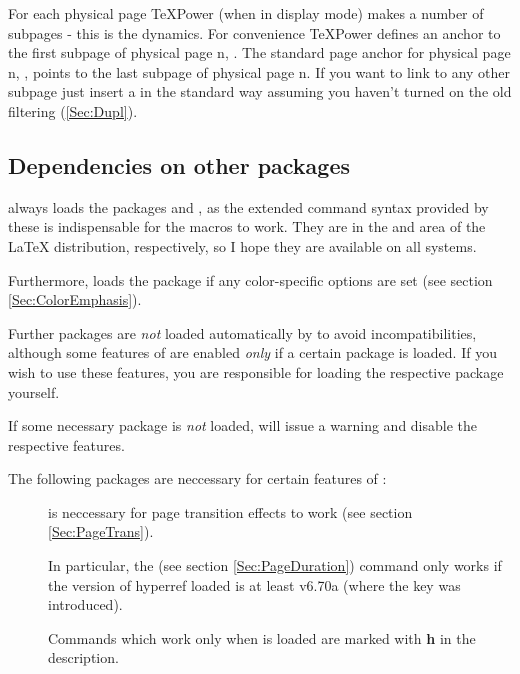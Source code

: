 \begin{slide}
For each physical page \TeX Power (when in display mode) makes a number of subpages - this is
the dynamics. For convenience \TeX Power defines an anchor to the first subpage of physical page n,
. The standard page anchor for physical page n,
, points to the last subpage of physical page n. If you want to
link to any other subpage just insert a  in the standard way assuming you haven't
turned on the old filtering (\ref{Sec:Dupl}).

\newslide

\subsection{Dependencies on other packages}
 always loads the packages  and , as the extended command syntax provided by
these is indispensable for the macros to work. They are in the  and  area of the \LaTeX{}
distribution, respectively, so I hope they are available on all systems.

Furthermore,  loads the package  if any color-specific options are set (see section
\ref{Sec:ColorEmphasis}).

Further packages are \emph{not} loaded automatically by  to avoid incompatibilities, although some
features of  are enabled \emph{only} if a certain package is loaded. If you wish to use these features,
you are responsible for loading the respective package yourself.

If some necessary package is \emph{not} loaded,  will issue a warning and disable the respective
features.

The following packages are neccessary for certain features of :
\begin{description}
\item[]
  is neccessary for page transition effects to work (see section
  \ref{Sec:PageTrans}).

  In particular, the  (see section \ref{Sec:PageDuration}) command only works if the version of
  hyperref loaded is at least v6.70a (where the  key was introduced).

  Commands which work only when  is loaded are marked with \textbf{\textsf{h}} in the description.


\end{description}
\end{slide}
